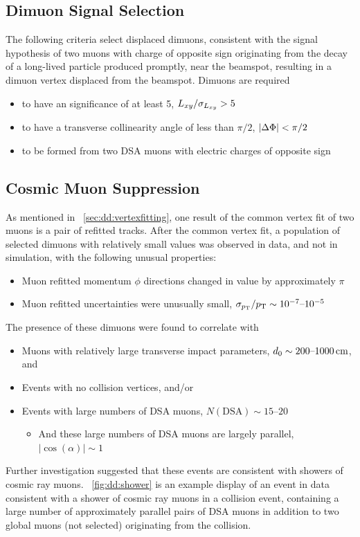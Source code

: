 \subsection{Dimuon Signal Selection}
The following criteria select displaced dimuons, consistent with the signal hypothesis of two muons with charge of opposite sign originating from the decay of a long-lived particle produced promptly, near the beamspot, resulting in a dimuon vertex displaced from the beamspot.
Dimuons are required
\begin{itemize}
  \item to have an \Lxy significance of at least 5, \ie $L_{xy}/\sigma_{L_{xy}} > 5$
  \item to have a transverse collinearity angle of less than $\pi/2$, \ie $|\Delta\Phi| < \pi/2$
  \item to be formed from two DSA muons with electric charges of opposite sign
\end{itemize}

\subsection{Cosmic Muon Suppression}
As mentioned in \Sec~\ref{sec:dd:vertexfitting}, one result of the common vertex fit of two muons is a pair of refitted tracks.
After the common vertex fit, a population of selected dimuons with relatively small \vchisq values was observed in data, and not in simulation, with the following unusual properties:
\begin{itemize}
  \item Muon refitted momentum $\phi$ directions changed in value by approximately $\pi$
  \item Muon refitted \pT uncertainties were unusually small, \ie $\sigma_{p_{\mathrm{T}}}/p_{\mathrm{T}} \sim 10^{-7}\text{--}10^{-5}$
\end{itemize}
The presence of these dimuons were found to correlate with
\begin{itemize}
  \item Muons with relatively large transverse impact parameters, \ie $d_0 \sim 200\text{--}1000\,\text{cm}$, and
  \item Events with no \pp collision vertices, and/or
  \item Events with large numbers of DSA muons, \ie $N(\text{DSA}) \sim 15\text{--}20$
    \begin{itemize}
      \item And these large numbers of DSA muons are largely parallel, \ie $|\cos(\alpha)| \sim 1$
    \end{itemize}
\end{itemize}
Further investigation suggested that these events are consistent with showers of cosmic ray muons.
\Fig~\ref{fig:dd:shower} is an example display of an event in data consistent with a shower of cosmic ray muons in a \pp collision event, containing a large number of approximately parallel pairs of DSA muons in addition to two global muons (not selected) originating from the \pp collision.

